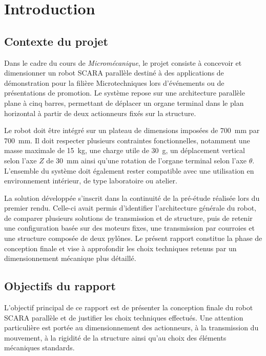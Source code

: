 \section{Introduction}
\subsection{Contexte du projet}

Dans le cadre du cours de \textit{Micromécanique}, le projet consiste à concevoir et dimensionner un robot SCARA parallèle destiné à des applications de démonstration pour la filière Microtechniques lors d'événements ou de présentations de promotion. Le système repose sur une architecture parallèle plane à cinq barres, permettant de déplacer un organe terminal dans le plan horizontal à partir de deux actionneurs fixés sur la structure.

Le robot doit être intégré sur un plateau de dimensions imposées de \SI{700}{\milli\metre} par \SI{700}{\milli\metre}. Il doit respecter plusieurs contraintes fonctionnelles, notamment une masse maximale de \SI{15}{\kilo\gram}, une charge utile de \SI{30}{\gram}, un déplacement vertical selon l’axe $Z$ de \SI{30}{\milli\metre} ainsi qu’une rotation de l’organe terminal selon l’axe $\theta$. L’ensemble du système doit également rester compatible avec une utilisation en environnement intérieur, de type laboratoire ou atelier.

La solution développée s’inscrit dans la continuité de la pré-étude réalisée lors du premier rendu. Celle-ci avait permis d’identifier l’architecture générale du robot, de comparer plusieurs solutions de transmission et de structure, puis de retenir une configuration basée sur des moteurs fixes, une transmission par courroies et une structure composée de deux pylônes. Le présent rapport constitue la phase de conception finale et vise à approfondir les choix techniques retenus par un dimensionnement mécanique plus détaillé.

\subsection{Objectifs du rapport}

L’objectif principal de ce rapport est de présenter la conception finale du robot SCARA parallèle et de justifier les choix techniques effectués. Une attention particulière est portée au dimensionnement des actionneurs, à la transmission du mouvement, à la rigidité de la structure ainsi qu’au choix des éléments mécaniques standards.

